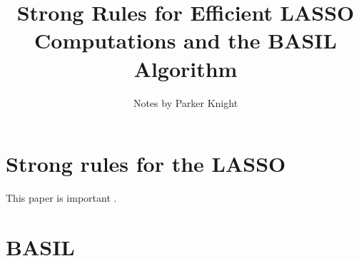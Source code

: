 \documentclass{amsart}
\title{Strong Rules for Efficient LASSO Computations and the BASIL Algorithm}
\author{Notes by Parker Knight}
\begin{document}
\maketitle

\section{Strong rules for the LASSO}

This paper is important \cite{tibshirani_strong_2012}.

\section{BASIL}




\end{document}
